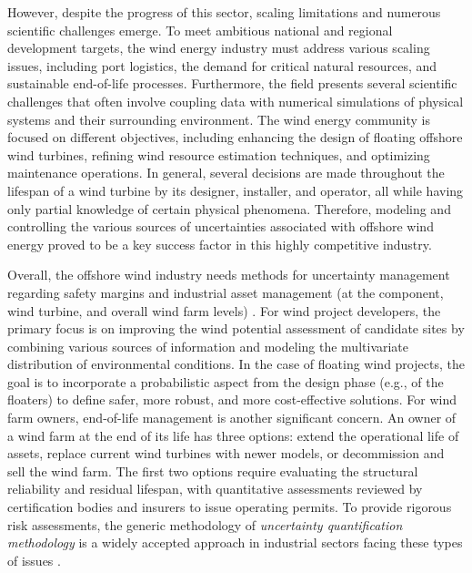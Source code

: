 However, despite the progress of this sector, scaling limitations and numerous scientific challenges emerge. 
To meet ambitious national and regional development targets, the wind energy industry must address various scaling issues, including port logistics, the demand for critical natural resources, and sustainable end-of-life processes. 
Furthermore, the field presents several scientific challenges that often involve coupling data with numerical simulations of physical systems and their surrounding environment. 
The wind energy community is focused on different objectives, including enhancing the design of floating offshore wind turbines, refining wind resource estimation techniques, and optimizing maintenance operations. 
In general, several decisions are made throughout the lifespan of a wind turbine by its designer, installer, and operator, all while having only partial knowledge of certain physical phenomena. 
Therefore, modeling and controlling the various sources of uncertainties associated with offshore wind energy proved to be a key success factor in this highly competitive industry.

Overall, the offshore wind industry needs methods for uncertainty management regarding safety margins and industrial asset management (at the component, wind turbine, and overall wind farm levels) \citep{OWT_review_2016}. 
For wind project developers, the primary focus is on improving the wind potential assessment of candidate sites by combining various sources of information and modeling the multivariate distribution of environmental conditions. 
In the case of floating wind projects, the goal is to incorporate a probabilistic aspect from the design phase (e.g., of the floaters) to define safer, more robust, and more cost-effective solutions.
For wind farm owners, end-of-life management is another significant concern. 
An owner of a wind farm at the end of its life has three options: extend the operational life of assets, replace current wind turbines with newer models, or decommission and sell the wind farm. 
The first two options require evaluating the structural reliability and residual lifespan, with quantitative assessments reviewed by certification bodies and insurers to issue operating permits. 
To provide rigorous risk assessments, the generic methodology of \textit{uncertainty quantification methodology} is a widely accepted approach in industrial sectors facing these types of issues \citep{rocquigny_2008}.



